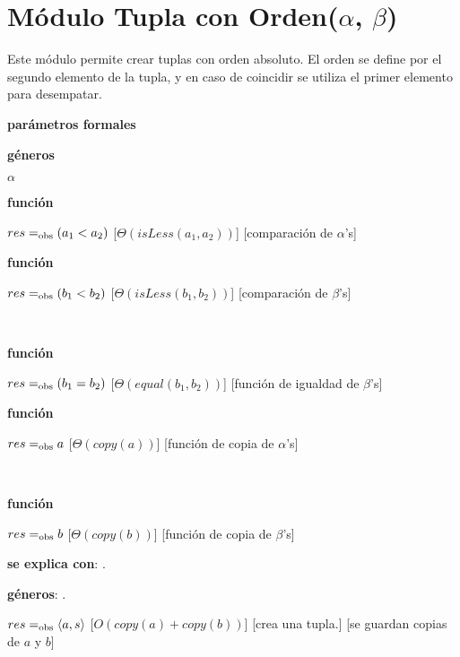 \section{Módulo Tupla con Orden(\texorpdfstring{$\alpha$}{α}, \texorpdfstring{$\beta$}{β})}

Este módulo permite crear tuplas con orden absoluto. El orden se define por el segundo elemento de la tupla, y en caso de coincidir se utiliza el primer elemento para desempatar.

\begin{Interfaz}

	\textbf{parámetros formales}\parindent\\
	\parbox{1.7cm}{\textbf{géneros}}$\alpha$\\
	\parbox[t]{1.7cm}{\textbf{función}}\parbox[t]{.5\textwidth-\parindent-1.7cm}{
		{$res =_{\mathrm{obs}} (a_1 < a_2)$}
		[$\Theta(isLess(a_1, a_2))$]
		[comparación de $\alpha$'s]
	}
	\parbox[t]{1.7cm}{\textbf{función}}\parbox[t]{.5\textwidth-\parindent-1.7cm}{
		{$res =_{\mathrm{obs}} (b_1 < b_2)$}
		[$\Theta(isLess(b_1, b_2))$]
		[comparación de $\beta$'s]
	}\\[2ex]
	\parbox[t]{1.7cm}{\textbf{función}}\parbox[t]{.5\textwidth-\parindent-1.7cm}{
		{$res =_{\mathrm{obs}} (b_1 = b_2)$}
		[$\Theta(equal(b_1, b_2))$]
		[función de igualdad de $\beta$'s]
	}
	\parbox[t]{1.7cm}{\textbf{función}}\parbox[t]{.5\textwidth-\parindent-1.7cm}{
		{$res =_{\mathrm{obs}} a$}
		[$\Theta(copy(a))$]
		[función de copia de $\alpha$'s]
	}\\[2ex]
	\parbox[t]{1.7cm}{\textbf{función}}\parbox[t]{.5\textwidth-\parindent-1.7cm}{
		{$res =_{\mathrm{obs}} b$}
		[$\Theta(copy(b))$]
		[función de copia de $\beta$'s]
	}

	\textbf{se explica con}: .

	\textbf{géneros}: .


	{$res =_{\mathrm{obs}} \langle a, s \rangle$}
	[$O(copy(a) + copy(b))$]
	[crea una tupla.]
	[se guardan copias de $a$ y $b$]	


\end{Interfaz}
